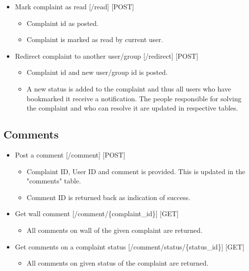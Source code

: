 \documentclass[12pt]{article}
\begin{document}
\begin{itemize}
\item Mark complaint as read [/read] [POST]
\begin{itemize}
\setlength\itemsep{-0.4em}
\item Complaint id as posted.
\item Complaint is marked as read by current user.
\end{itemize}
\item Redirect complaint to another user/group [/redirect] [POST]
\begin{itemize}
\setlength\itemsep{-0.4em}
\item Complaint id and new user/group id is posted.
\item A new status is added to the complaint and thus all users who have bookmarked it receive a notification. The people responsible for solving the complaint and who can resolve it are updated in respective tables.
\end{itemize}
\end{itemize}

\subsection{Comments}
\begin{itemize}
\setlength\itemsep{-0.4em}
\item Post a comment [/comment] [POST]
\begin{itemize}
\setlength\itemsep{-0.4em}
\item Complaint ID, User ID and comment is provided. This is updated in the "comments" table.
\item Comment ID is returned back as indication of success.
\end{itemize}
\item Get wall comment [/comment/\{complaint\_id\}] [GET]
\begin{itemize}
\setlength\itemsep{-0.4em}
\item All comments on wall of the given complaint are returned.
\end{itemize}
\item Get comments on a complaint status [/comment/status/\{status\_id\}] [GET]
\begin{itemize}
\setlength\itemsep{-0.4em}
\item All comments on given status of the complaint are returned.
\end{itemize}
\end{itemize}
\end{document}
